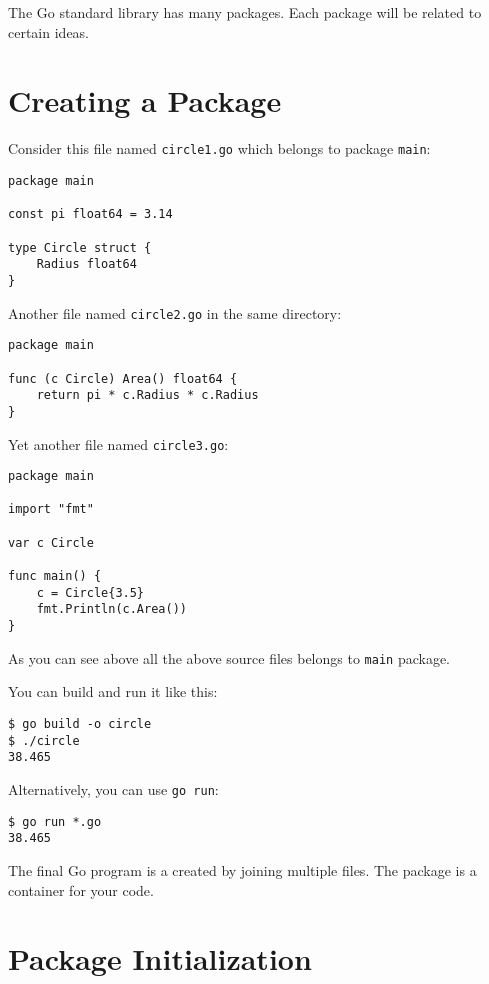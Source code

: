 The Go standard library has many packages. Each package will be
related to certain ideas.

\section{Creating a Package}

Consider this file named \texttt{circle1.go} which belongs to
package \texttt{main}:

\begin{lstlisting}[caption=circle1.go]
package main

const pi float64 = 3.14

type Circle struct {
    Radius float64
}
\end{lstlisting}

Another file named \texttt{circle2.go} in the same directory:

\begin{lstlisting}[caption=circle2.go]
package main

func (c Circle) Area() float64 {
    return pi * c.Radius * c.Radius
}
\end{lstlisting}

Yet another file named \texttt{circle3.go}:

\begin{lstlisting}[caption=circle3.go]
package main

import "fmt"

var c Circle

func main() {
    c = Circle{3.5}
    fmt.Println(c.Area())
}
\end{lstlisting}

As you can see above all the above source files belongs
to \texttt{main} package.

You can build and run it like this:

\begin{lstlisting}[numbers=none]
$ go build -o circle
$ ./circle
38.465
\end{lstlisting}

Alternatively, you can use \texttt{go run}:

\begin{lstlisting}[numbers=none]
$ go run *.go
38.465
\end{lstlisting}

The final Go program is a created by joining multiple files.  The
package is a container for your code.

\section{Package Initialization}

